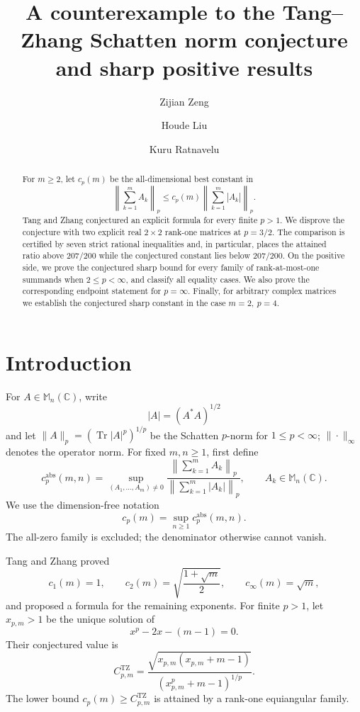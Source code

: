 \documentclass[11pt,reqno]{amsart}
\title[A counterexample to a Schatten norm conjecture]
{A counterexample to the Tang--Zhang Schatten norm conjecture\\
and sharp positive results}
\author{Zijian Zeng}
\author{Houde Liu}
\author{Kuru Ratnavelu}
\theoremstyle{remark}
\newcommand{\C}{\mathbb C}
\newcommand{\M}{\mathbb M}
\newcommand{\Tr}{\operatorname{Tr}}
\newcommand{\TZ}{C^{\mathrm{TZ}}}
\begin{document}
\begin{abstract}
For \(m\ge2\), let \(c_p(m)\) be the all-dimensional best constant in
\[
 \left\|\sum_{k=1}^m A_k\right\|_p
 \le c_p(m)\left\|\sum_{k=1}^m |A_k|\right\|_p .
\]
Tang and Zhang conjectured an explicit formula for every finite \(p>1\).
We disprove the conjecture with two explicit real \(2\times2\) rank-one
matrices at \(p=3/2\).  The comparison is certified by seven strict
rational inequalities and, in particular, places the attained ratio above
\(207/200\) while the conjectured constant lies below \(207/200\).
On the positive side, we prove the conjectured sharp bound for every family
of rank-at-most-one summands when \(2\le p<\infty\), and classify all equality
cases.  We also prove the corresponding endpoint statement for \(p=\infty\).
Finally, for arbitrary complex matrices we establish the conjectured sharp
constant in the case \(m=2,\ p=4\).
\end{abstract}

\maketitle

\section{Introduction}

For \(A\in\M_n(\C)\), write
\[
 |A|=(A^*A)^{1/2}
\]
and let \(\|A\|_p=(\Tr |A|^p)^{1/p}\) be the Schatten \(p\)-norm for
\(1\le p<\infty\); \(\|\cdot\|_\infty\) denotes the operator norm.
For fixed \(m,n\ge1\), first define
\begin{equation}\label{eq:def-cpmn}
 c_p^{\mathrm{abs}}(m,n)=
 \sup_{(A_1,\ldots,A_m)\ne0}
 \frac{\left\|\sum_{k=1}^m A_k\right\|_p}
      {\left\|\sum_{k=1}^m |A_k|\right\|_p},
 \qquad A_k\in\M_n(\C).
\end{equation}
We use the dimension-free notation
\begin{equation}\label{eq:def-cpm}
 c_p(m)=\sup_{n\ge1}c_p^{\mathrm{abs}}(m,n).
\end{equation}
The all-zero family is excluded; the denominator otherwise cannot vanish.

Tang and Zhang \cite{Tang_2026} proved
\[
 c_1(m)=1,\qquad
 c_2(m)=\sqrt{\frac{1+\sqrt m}{2}},\qquad
 c_\infty(m)=\sqrt m,
\]
and proposed a formula for the remaining exponents.  For finite \(p>1\),
let \(x_{p,m}>1\) be the unique solution of
\begin{equation}\label{eq:root-general}
 x^p-2x-(m-1)=0.
\end{equation}
Their conjectured value is
\begin{equation}\label{eq:TZ}
 \TZ_{p,m}
 =
 \frac{\sqrt{x_{p,m}(x_{p,m}+m-1)}}
      {(x_{p,m}^p+m-1)^{1/p}}.
\end{equation}
The lower bound \(c_p(m)\ge\TZ_{p,m}\) is attained by a rank-one
equiangular family.
\end{document}

